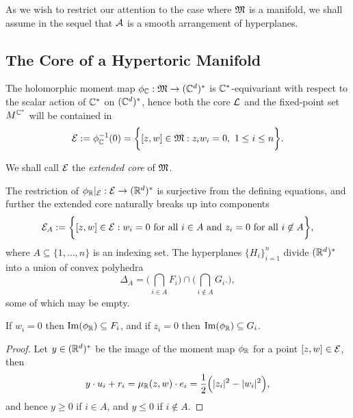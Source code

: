 As we wish to restrict our attention to the case where $\mathfrak{M}$ is a manifold, we shall assume in the sequel that $\mathcal{A}$ is a smooth arrangement of hyperplanes.

\subsection{The Core of a Hypertoric Manifold}

The holomorphic moment map $\phi_{\mathbb{C}}:\mathfrak{M} \rightarrow (\mathbb{C}^{d})^{\ast}$ is $\mathbb{C}^{\ast}$-equivariant with respect to the scalar action of $\mathbb{C}^{\ast}$ on $(\mathbb{C}^{d})^{\ast}$, hence both the core $\mathcal{L}$ and the fixed-point set $M^{\mathbb{C}^{\ast}}$ will be contained in
\begin{equation*}
	\mathcal{E}:= \phi_{\mathbb{C}}^{-1}(0) = \bigg\{ [z,w] \in \mathfrak{M} : z_{i}w_{i} = 0,\ 1 \leq i \leq n \bigg\}.
\end{equation*}

\begin{defn}
	We shall call $\mathcal{E}$ the \emph{extended core} of $\mathfrak{M}$.
\end{defn}

The restriction of $\phi_{\mathbb{R}}|_{\mathcal{E}}: \mathcal{E} \rightarrow (\mathbb{R}^{d})^{\ast}$ is surjective from the defining equations, and further the extended core naturally breaks up into components
\begin{equation*}
	\mathcal{E}_{A} :=  \bigg\{ [z,w] \in \mathcal{E} : w_{i} = 0 \text{ for all } i \in A\text{ and } z_{i} = 0 \text{ for all } i \not\in A \bigg\},
\end{equation*}
where $A \subseteq \{1,\ldots, n\}$ is an indexing set. The hyperplanes $\{ H_{i}  \}_{i=1}^{n}$ divide $(\mathbb{R}^{d})^{\ast}$ into a union of convex polyhedra
\begin{equation*}
	\Delta_{A} = \bigg(\bigcap_{i\in A} F_{i}   \bigg) \cap \bigg( \bigcap_{i\not\in A} G_{i}.   \bigg),
\end{equation*}
some of which may be empty.

\begin{lem}
	If $w_{i} = 0$ then $\operatorname{Im}(\phi_{\mathbb{R}}) \subseteq F_{i}$, and if $z_{i} = 0$ then $\operatorname{Im}(\phi_{\mathbb{R}}) \subseteq G_{i}$.
\end{lem}

\begin{proof}
	Let $y \in (\mathbb{R}^{d})^{\ast}$ be the image of the moment map $\phi_{\mathbb{R}}$ for a point $[z,w] \in \mathcal{E}$, then
	\begin{equation*}
		y \cdot u_{i} + r_{i} = \mu_{\mathbb{R}}(z,w) \cdot e_{i} = \frac{1}{2}\Big( |z_{i}|^{2} - |w_{i}|^{2} \Big),
	\end{equation*}
	and hence $y \geq 0$ if $i \in A$, and $y \leq 0$ if $i \not\in A$.
\end{proof}


